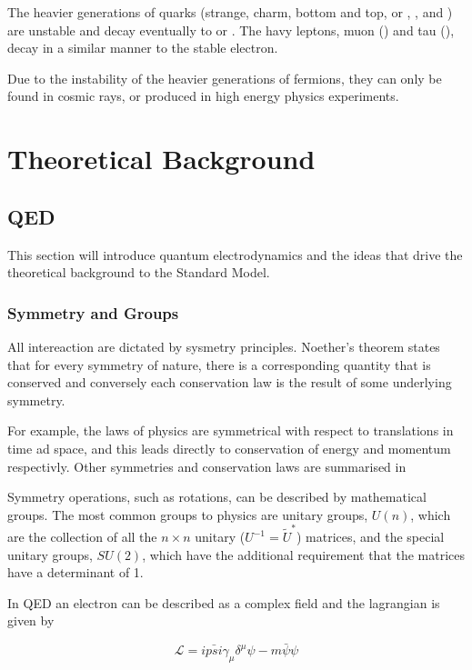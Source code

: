 The heavier generations of quarks (strange, charm, bottom and top, or \Pstrange,
\Pcharm, \Pbottom and \Ptop) are unstable and decay eventually to \Pup or
\Pdown.
The havy leptons, muon (\Pmuon) and tau (\Ptau), decay in a similar manner to
the stable electron. 

Due to the instability of the heavier generations of fermions, they can only be
found in  cosmic rays, or produced in high energy physics experiments.

\section{Theoretical Background}

\subsection{QED}
This section will introduce quantum electrodynamics and the ideas that drive the
theoretical background to the Standard Model.

\subsubsection{Symmetry and Groups}
All intereaction are dictated by sysmetry principles. Noether's theorem states
that for every symmetry of nature, there is a corresponding quantity that is
conserved and conversely each conservation law is the result of some underlying
symmetry.

For example, the laws of physics are symmetrical with respect to translations in
time ad space, and this leads directly to conservation of energy and momentum
respectivly. Other symmetries and conservation laws are summarised in
\TableRef{}

Symmetry operations, such as rotations, can be described by mathematical groups.
The most common groups to physics are unitary groups, $U(n)$, which are the
collection of all the $n\times n$ unitary ($U^{-1} = \tilde{U}^{*}$) matrices, and
the special unitary groups, $SU(2)$, which have the additional requirement that
the matrices have a determinant of 1.

In QED an electron can be described as a complex field and the lagrangian is
given by


\begin{equation}
\mathcal{L} = i \bar{psi} \gamma_{\mu} \delta^{\mu} \psi - m \bar{\psi}\psi
\end{equation}

